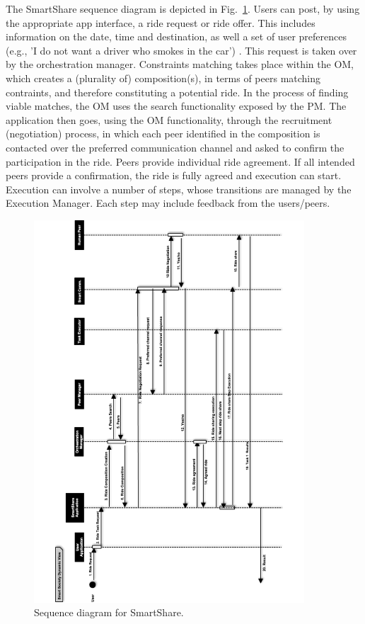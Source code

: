 The SmartShare sequence diagram is depicted in Fig.~\ref{fig:smartshare}. Users can post, by using the appropriate app interface, a ride request or ride offer. This includes information on the date, time and destination, as well a set of user preferences (e.g., 'I do not want a driver who smokes in the car') . This request is taken over by the orchestration manager. Constraints matching takes place within the OM, which creates a (plurality of) composition(s), in terms of peers matching contraints, and therefore constituting a potential ride. In the process of finding viable matches, the OM uses the search functionality exposed by the PM. 
The application then goes, using the OM functionality, through the recruitment (negotiation) process, in which each peer identified in the composition is contacted over the preferred communication channel and asked to confirm the participation in the ride. Peers provide individual ride agreement. If all intended peers provide a confirmation, the ride is fully agreed and execution can start. Execution can involve a number of steps, whose transitions are managed by the Execution Manager. Each step may include feedback from the users/peers. 

\begin{figure}
\centering
\includegraphics[width=0.9\textwidth]{./figs/sequenceRide}
\caption{Sequence diagram for SmartShare.}
\label{fig:smartshare}
\end{figure}
